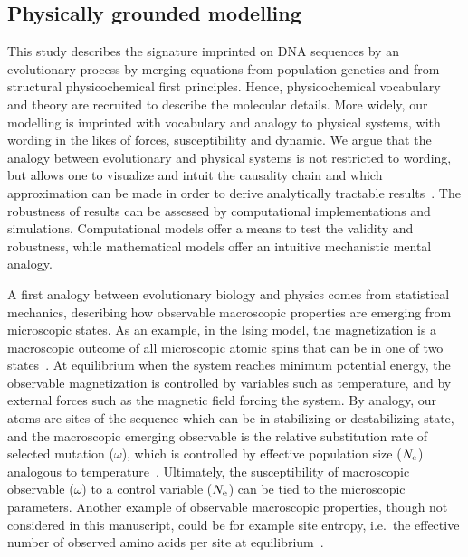\subsection{Physically grounded modelling}
This study describes the signature imprinted on \acrshort{DNA} sequences by an evolutionary process by merging equations from population genetics and from structural physicochemical first principles.
Hence, physicochemical vocabulary and theory are recruited to describe the molecular details.
More widely, our modelling is imprinted with vocabulary and analogy to physical systems, with wording in the likes of forces, susceptibility and dynamic.
We argue that the analogy between evolutionary and physical systems is not restricted to wording, but allows one to visualize and intuit the causality chain and which approximation can be made in order to derive analytically tractable results~\citep{Sella2005, Mustonen2009, Bastolla2012, Bastolla2017}.
The robustness of results can be assessed by computational implementations and simulations.
Computational models offer a means to test the validity and robustness, while mathematical models offer an intuitive mechanistic mental analogy.

A first analogy between evolutionary biology and physics comes from statistical mechanics, describing how observable macroscopic properties are emerging from microscopic states.
As an example, in the Ising model, the magnetization is a macroscopic outcome of all microscopic atomic spins that can be in one of two states~\citep{Brush1967}.
At equilibrium when the system reaches minimum potential energy, the observable magnetization is controlled by variables such as temperature, and by external forces such as the magnetic field forcing the system.
By analogy, our atoms are sites of the sequence which can be in stabilizing or destabilizing state, and the macroscopic emerging observable is the relative \gls{substitution} rate of selected mutation ($\omega$), which is controlled by \gls{effective population size} ($N_{\text{e}}$) analogous to temperature~\citep{Sella2005}.
Ultimately, the susceptibility of macroscopic observable ($\omega$) to a control variable ($N_{\text{e}}$) can be tied to the microscopic parameters.
Another example of observable macroscopic properties, though not considered in this manuscript, could be for example site entropy, i.e.~the effective number of observed amino acids per site at equilibrium~\citep{Goldstein2016, Jimenez2018, Jiang2018}.

